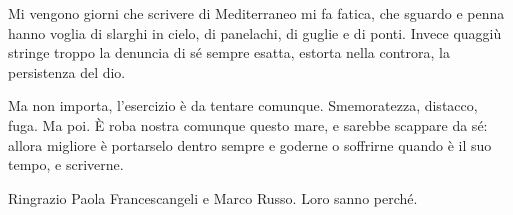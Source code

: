 Mi vengono giorni che scrivere di Mediterraneo mi fa fatica, che sguardo e penna hanno voglia di slarghi in cielo, di panelachi, di guglie e di ponti. Invece quaggiù stringe troppo la denuncia di sé sempre esatta, estorta nella controra, la persistenza del dio.

Ma non importa, l'esercizio è da tentare comunque. Smemoratezza, distacco, fuga. Ma poi. È roba nostra comunque questo mare, e sarebbe scappare da sé: allora migliore è portarselo dentro sempre e goderne o soffrirne quando è il suo tempo, e scriverne.

\newpage

\vspace*{12cm}

Ringrazio Paola Francescangeli e Marco Russo. Loro sanno perché.
